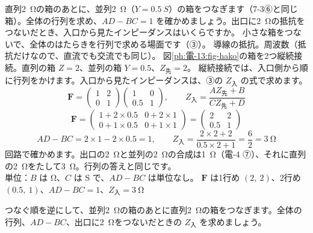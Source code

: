\label{ph:電-13:ex7}
\begin{phreidai}[直列の箱と並列の箱をつなぐ]
直列\qty{2}{\ohm}の箱のあとに、並列\qty{2}{\ohm}（$Y=\qty{0.5}{S}$）の箱をつなぎます（7-3⑥と同じ箱）。全体の行列を求め、$AD-BC=1$ を確かめましょう。出口に\qty{2}{\ohm}の抵抗をつないだとき、入口から見たインピーダンスはいくらですか。
\phbamen
小さな箱をつないで、全体のはたらきを行列で求める場面です（③）。
\phmushi
導線の抵抗。周波数（抵抗だけなので、直流でも交流でも同じ）。
\phzu
図\ref{ph:電-13:fig-hako}の箱を2つ縦続接続。直列の箱 $Z=2$、並列の箱 $Y=0.5$、$Z_{\text{先}}=2$。
\phriyu
縦続接続では、入口側から順に行列をかけます。入口から見たインピーダンスは、③の $Z_{\text{入}}$ の式で求めます。
\phtateru
\[\mathbf F=\begin{pmatrix}1&2\\0&1\end{pmatrix}\begin{pmatrix}1&0\\0.5&1\end{pmatrix},\qquad Z_{\text{入}}=\frac{AZ_{\text{先}}+B}{CZ_{\text{先}}+D}\]
\phtoku
\[\mathbf F=\begin{pmatrix}1+2\times0.5&0+2\times1\\0+1\times0.5&0+1\times1\end{pmatrix}=\begin{pmatrix}2&2\\0.5&1\end{pmatrix}\]
\[AD-BC=2\times1-2\times0.5=1,\qquad Z_{\text{入}}=\frac{2\times2+2}{0.5\times2+1}=\frac{6}{2}=\qty{3}{\ohm}\]
\phtashikame
回路で確かめます。出口の\qty{2}{\ohm}と並列の\qty{2}{\ohm}の合成は\qty{1}{\ohm}（電-4 ⑦）、それに直列の\qty{2}{\ohm}をたして\qty{3}{\ohm}。行列の答えと同じです。\\
単位：$B$ は Ω、$C$ は S で、$AD-BC$ は単位なし。
\kotae $\mathbf F$ は1行め $(2,\ 2)$、2行め $(0.5,\ 1)$、$AD-BC=1$、$Z_{\text{入}}=\qty{3}{\ohm}$
\end{phreidai}
\begin{jibun}
つなぐ順を逆にして、並列\qty{2}{\ohm}の箱のあとに直列\qty{2}{\ohm}の箱をつなぎます。全体の行列、$AD-BC$、出口に\qty{2}{\ohm}をつないだときの $Z_{\text{入}}$ を求めましょう。
\end{jibun}

